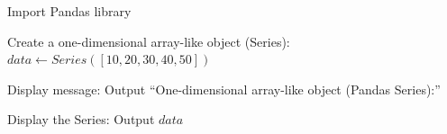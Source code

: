 \begin{algorithm}
\caption{Create and Display a One-Dimensional Pandas Series}
\begin{algorithmic}[1]

\STATE Import Pandas library

\STATE Create a one-dimensional array-like object (Series):
\STATE $data \gets Series([10, 20, 30, 40, 50])$

\STATE Display message:
\STATE Output ``One-dimensional array-like object (Pandas Series):''

\STATE Display the Series:
\STATE Output $data$

\end{algorithmic}
\end{algorithm}
